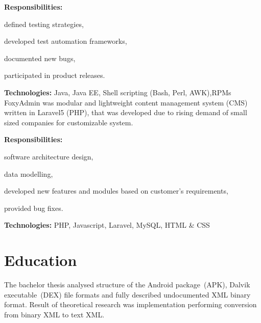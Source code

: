 \documentclass[a4paper]{deedy-resume}
\begin{document}
\vspace{4pt}
\textbf{Responsibilities:}
\begin{tightitemize}
    \item defined testing strategies,
    \item developed test automation frameworks,
    \item documented new bugs,
    \item participated in product releases.
\end{tightitemize}
\vspace{\topsep}
\footnotesize\textbf{Technologies:} Java, Java EE, Shell scripting (Bash, Perl, AWK),RPMs
\normalsize
\sectionspace
\newline
FoxyAdmin was modular and lightweight content management system (CMS) written in Laravel5 (PHP), that was developed due to rising demand of small sized companies for customizable system.

\vspace{4pt}
\textbf{Responsibilities:}
\begin{tightitemize}
    \item software architecture design,
    \item data modelling,
    \item developed new features and modules based on customer's requirements,
    \item provided bug fixes.
\end{tightitemize}
\vspace{\topsep}
\footnotesize\textbf{Technologies:} PHP, Javascript, Laravel, MySQL, HTML \& CSS
\normalsize
\vspace{5pt}
\section{Education}
\vspace{\topsep}
\vspace{\topsep}
The bachelor thesis analysed structure of the Android package~(APK), Dalvik executable~(DEX) file formats and fully described undocumented XML binary format.
Result of theoretical research was implementation performing conversion from binary XML to text XML.
\end{document}
